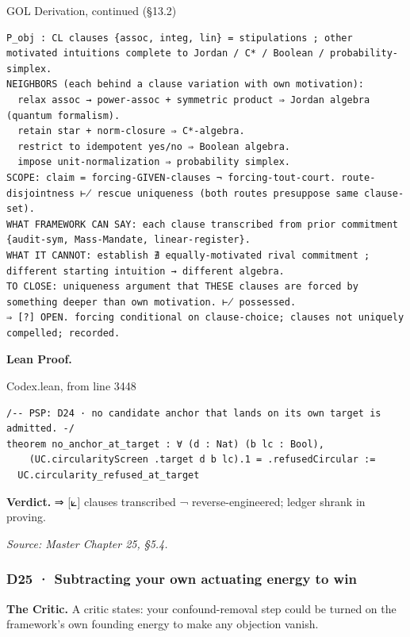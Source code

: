 \documentclass[10pt,twocolumn]{article}
\begin{document}
\begin{golbox}{GOL Derivation, continued (§13.2)}
\begin{lstlisting}[style=golv]
P_obj : CL clauses {assoc, integ, lin} = stipulations ; other motivated intuitions complete to Jordan / C* / Boolean / probability-simplex.
NEIGHBORS (each behind a clause variation with own motivation):
  relax assoc → power-assoc + symmetric product ⇒ Jordan algebra (quantum formalism).
  retain star + norm-closure ⇒ C*-algebra.
  restrict to idempotent yes/no ⇒ Boolean algebra.
  impose unit-normalization ⇒ probability simplex.
SCOPE: claim = forcing-GIVEN-clauses ¬ forcing-tout-court. route-disjointness ⊬ rescue uniqueness (both routes presuppose same clause-set).
WHAT FRAMEWORK CAN SAY: each clause transcribed from prior commitment {audit-sym, Mass-Mandate, linear-register}.
WHAT IT CANNOT: establish ∄ equally-motivated rival commitment ; different starting intuition → different algebra.
TO CLOSE: uniqueness argument that THESE clauses are forced by something deeper than own motivation. ⊬ possessed.
⇒ [?] OPEN. forcing conditional on clause-choice; clauses not uniquely compelled; recorded.
\end{lstlisting}
\end{golbox}

\textbf{Lean Proof.}

\begin{leanexcerpt}{Codex.lean, from line 3448}
\begin{lstlisting}[style=leanx,firstnumber=3448]
/-- PSP: D24 · no candidate anchor that lands on its own target is admitted. -/
theorem no_anchor_at_target : ∀ (d : Nat) (b lc : Bool),
    (UC.circularityScreen .target d b lc).1 = .refusedCircular :=
  UC.circularity_refused_at_target
\end{lstlisting}
\end{leanexcerpt}

\textbf{Verdict.} ⇒ {[}⟀{]} clauses transcribed ¬ reverse-engineered;
ledger shrank in proving.

\emph{Source: Master Chapter 25, §5.4.}

\hypertarget{d25-subtracting-your-own-actuating-energy-to-win}{%
\subsubsection{D25 · Subtracting your own actuating energy to
win}\label{d25-subtracting-your-own-actuating-energy-to-win}}

\textbf{The Critic.} A critic states: your confound-removal step could
be turned on the framework's own founding energy to make any objection
vanish.
\end{document}
